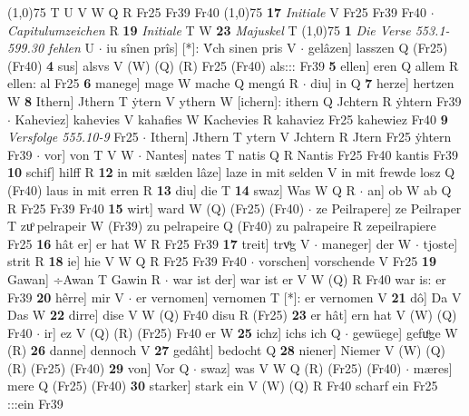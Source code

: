 \documentclass[8pt,a4paper,notitlepage]{article}
\begin{document}
\begin{table}[ht]
\begin{minipage}[t]{0.5\linewidth}
\line(1,0){75} \newline
T U V W Q R Fr25 Fr39 Fr40 \newline
\line(1,0){75} \newline
\textbf{17} \textit{Initiale} V Fr25 Fr39 Fr40   $\cdot$ \textit{Capitulumzeichen} R  \textbf{19} \textit{Initiale} T W  \textbf{23} \textit{Majuskel} T  \newline
\line(1,0){75} \newline
\textbf{1} \textit{Die Verse 553.1-599.30 fehlen} U   $\cdot$ iu sînen prîs] [*]: V́ch sinen pris V  $\cdot$ gelâzen] lasszen Q (Fr25) (Fr40) \textbf{4} sus] alsvs V (W) (Q) (R) Fr25 (Fr40) als::: Fr39 \textbf{5} ellen] eren Q allem R ellen: al Fr25 \textbf{6} manege] mage W mache Q mengú R  $\cdot$ diu] in Q \textbf{7} herze] hertzen W \textbf{8} Ithern] Jthern T ẏtern V ythern W [ichern]: ithern Q Jchtern R ẏhtern Fr39  $\cdot$ Kaheviez] kahevies V kahafies W Kachevies R kahaviez Fr25 kahewiez Fr40 \textbf{9} \textit{Versfolge 555.10-9} Fr25   $\cdot$ Ithern] Jthern T ytern V Jchtern R Jtern Fr25 ẏhtern Fr39  $\cdot$ vor] von T V W  $\cdot$ Nantes] nates T natis Q R Nantis Fr25 Fr40 kantis Fr39 \textbf{10} schif] hilff R \textbf{12} in mit sælden lâze] laze in mit selden V in mit frewde losz Q (Fr40) laus in mit erren R \textbf{13} diu] die T \textbf{14} swaz] Was W Q R  $\cdot$ an] ob W ab Q R Fr25 Fr39 Fr40 \textbf{15} wirt] ward W (Q) (Fr25) (Fr40)  $\cdot$ ze Peilrapere] ze Peilraper T zuͦ pelrapeir W (Fr39) zu pelrapeire Q (Fr40) zu palrapeire R zepeilrapiere Fr25 \textbf{16} hât er] er hat W R Fr25 Fr39 \textbf{17} treit] trvͦg V  $\cdot$ maneger] der W  $\cdot$ tjoste] strit R \textbf{18} ie] hie V W Q R Fr25 Fr39 Fr40  $\cdot$ vorschen] vorschende V Fr25 \textbf{19} Gawan] ÷Awan T Gawin R  $\cdot$ war ist der] war ist er V W (Q) R Fr40 war is: er Fr39 \textbf{20} hêrre] mir V  $\cdot$ er vernomen] vernomen T [*]: er vernomen V \textbf{21} dô] Da V Das W \textbf{22} dirre] dise V W (Q) Fr40 disu R (Fr25) \textbf{23} er hât] ern hat V (W) (Q) Fr40  $\cdot$ ir] ez V (Q) (R) (Fr25) Fr40 er W \textbf{25} ichz] ichs ich Q  $\cdot$ gewüege] gefuͦge W (R) \textbf{26} danne] dennoch V \textbf{27} gedâht] bedocht Q \textbf{28} niener] Niemer V (W) (Q) (R) (Fr25) (Fr40) \textbf{29} von] Vor Q  $\cdot$ swaz] was V W Q (R) (Fr25) (Fr40)  $\cdot$ mæres] mere Q (Fr25) (Fr40) \textbf{30} starker] stark ein V (W) (Q) R Fr40 scharf ein Fr25 :::ein Fr39 \newline
\end{minipage}
\end{table}
\end{document}
